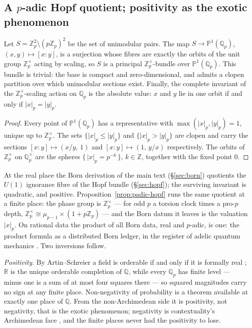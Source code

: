 \subsection{A $p$-adic Hopf quotient; positivity as the exotic phenomenon}
\label{app:padic-hopf}

\begin{proposition}\label{prop:padic-hopf}
Let $S = \mathbb{Z}_p^2 \setminus (p\mathbb{Z}_p)^2$ be the set of unimodular pairs.
The map $S \to \mathbb{P}^1(\mathbb{Q}_p)$, $(x,y) \mapsto [x:y]$, is a surjection
whose fibres are exactly the orbits of the unit group $\mathbb{Z}_p^{\times}$ acting
by scaling, so $S$ is a principal $\mathbb{Z}_p^{\times}$-bundle over
$\mathbb{P}^1(\mathbb{Q}_p)$. This bundle is trivial: the base is compact and
zero-dimensional, and admits a clopen partition over which unimodular sections exist.
Finally, the complete invariant of the $\mathbb{Z}_p^{\times}$-scaling action on
$\mathbb{Q}_p$ is the absolute value: $x$ and $y$ lie in one orbit if and only if
$|x|_p = |y|_p$.
\end{proposition}

\begin{proof}
Every point of $\mathbb{P}^1(\mathbb{Q}_p)$ has a representative with
$\max(|x|_p, |y|_p) = 1$, unique up to $\mathbb{Z}_p^{\times}$. The sets
$\{|x|_p \le |y|_p\}$ and $\{|x|_p > |y|_p\}$ are clopen and carry the sections
$[x:y] \mapsto (x/y,\, 1)$ and $[x:y] \mapsto (1,\, y/x)$ respectively. The orbits of
$\mathbb{Z}_p^{\times}$ on $\mathbb{Q}_p^{\times}$ are the spheres
$\{\,|x|_p = p^{-k}\,\}$, $k \in \mathbb{Z}$, together with the fixed point $0$.
\end{proof}

At the real place the Born derivation of the main text (\S\ref{sec:born}) quotients
the $U(1)$ ignorance fibre of the Hopf bundle (\S\ref{sec:hopf}); the surviving
invariant is quadratic, and positive. Proposition~\ref{prop:padic-hopf} runs the same
quotient at a finite place: the phase group is $\mathbb{Z}_p^{\times}$ --- for odd $p$
a torsion clock times a pro-$p$ depth,
$\mathbb{Z}_p^{\times} \cong \mu_{p-1} \times (1 + p\mathbb{Z}_p)$
\autocite{gouvea1997} --- and the Born datum it leaves is the valuation $|x|_p$. On
rational data the product of all Born data, real and $p$-adic, is one: the product
formula as a distributed Born ledger, in the register of adelic quantum mechanics
\autocite{vladimirovvolovich1989, dragovich1995}. Two inversions follow.

\emph{Positivity.} By Artin--Schreier a field is orderable if and only if it is
formally real \autocite{artinschreier1927}; $\mathbb{R}$ is the unique orderable
completion of $\mathbb{Q}$, while every $\mathbb{Q}_p$ has finite level --- minus one
is a sum of at most four squares there \autocite{lam2005} --- so squared magnitudes
carry no sign at any finite place. Non-negativity of probability is a theorem
available at exactly one place of $\mathbb{Q}$. From the non-Archimedean side it is
positivity, not negativity, that is the exotic phenomenon; negativity is
contextuality's Archimedean face \autocite{spekkens2008}, and the finite places never
had the positivity to lose.

